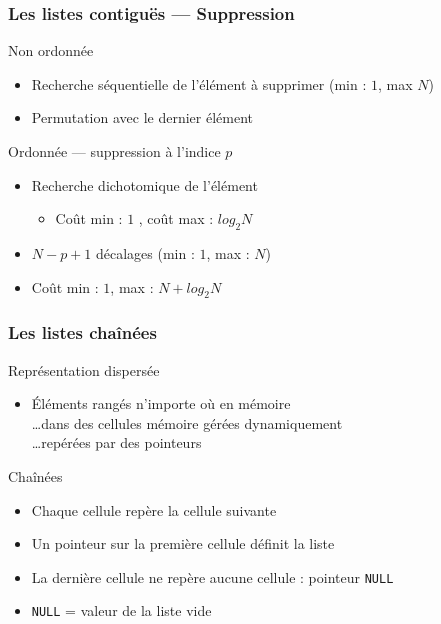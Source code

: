 \documentclass[table,handout,tikz,12pt,svgnames]{beamer}
\begin{document}
\begin{frame}[fragile=singleslide]
	\frametitle{Les listes contiguës --- Suppression}
	\begin{block}{Non ordonnée}
		\begin{itemize}
			\item Recherche séquentielle de l'élément à supprimer (min : $1$, max $N$)
			\item Permutation avec le dernier élément
		\end{itemize}
	\end{block}
	\begin{block}{Ordonnée --- suppression à l'indice $p$}
		\begin{itemize}
			\item Recherche dichotomique de l'élément
			\begin{itemize}
				\item Coût min : $1$ , coût max : $log_2N$
			\end{itemize}
			\item $N-p+1$ décalages (min : $1$, max : $N$)
			\item Coût min : $1$, max : $N + log_2N$
		\end{itemize}
	\end{block}
\end{frame}


\begin{frame}[fragile=singleslide]
	\frametitle{Les listes chaînées}
	\begin{block}{Représentation dispersée}
		\begin{itemize}
			\item Éléments rangés n'importe où en mémoire\\
			\ldots dans des cellules mémoire gérées dynamiquement\\
			\ldots repérées par des pointeurs
		\end{itemize}
	\end{block}
	\begin{block}{Chaînées}
		\begin{itemize}
			\item Chaque cellule repère la cellule suivante
			\item Un pointeur sur la première cellule définit la liste
			\item La dernière cellule ne repère aucune cellule : pointeur \texttt{NULL}
			\item \texttt{NULL} = valeur de la liste vide
		\end{itemize}
	\end{block}
\end{frame}
\end{document}
